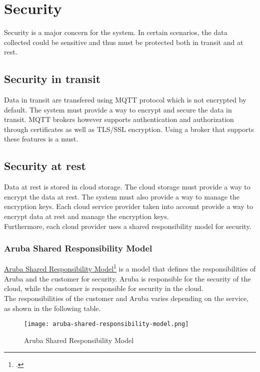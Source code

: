 \newpage
\section{Security}
Security is a major concern for the system. In certain scenarios, the data collected could be sensitive and thus must be protected both in transit and at rest.
    \subsection{Security in transit}
    Data in transit are transfered using MQTT protocol which is not encrypted by default. The system must provide a way to encrypt and secure the data in transit. MQTT brokers however supports authentication and authorization through certificates as well as TLS/SSL encryption. Using a broker that supports these features is a must.
    
    \subsection{Security at rest}
    Data at rest is stored in cloud storage. The cloud storage must provide a way to encrypt the data at rest. The system must also provide a way to manage the encryption keys. Each cloud service provider taken into account provide a way to encrypt data at rest and manage the encryption keys.\\ 
    Furthermore, each cloud provider uses a shared responsibility model for security.
    
    \newpage
    \subsubsection{Aruba Shared Responsibility Model}
    \href{https://kb.arubacloud.com/en/computing/use-and-technology/shared-responsibility-model.aspx}{Aruba Shared Responsibility Model}\footcite{site:aruba-shared-responsibility-model} is a model that defines the responsibilities of Aruba and the customer for security. Aruba is responsible for the security of the cloud, while the customer is responsible for security in the cloud.\\ The responsibilities of the customer and Aruba varies depending on the service, as shown in the following table.\\ 
    \begin{figure}[htbp]
        \centering
        \texttt{[image: aruba-shared-responsibility-model.png]}
        \caption{Aruba Shared Responsibility Model}
    \end{figure}

